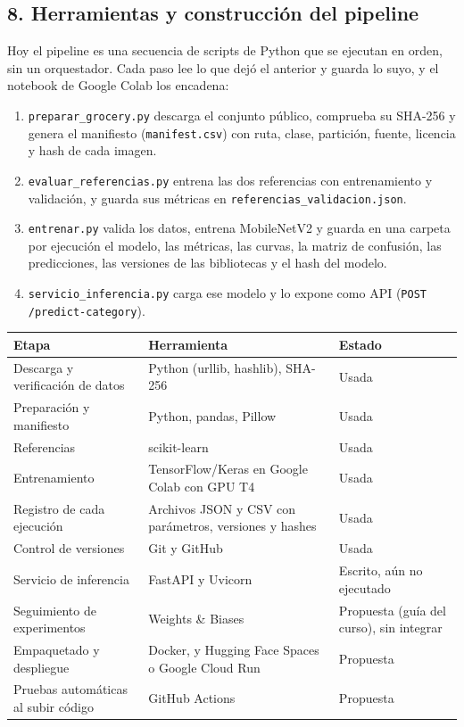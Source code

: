 \documentclass[11pt,a4paper]{article}
\begin{document}
\subsection*{8. Herramientas y construcción del pipeline}
\noindent Hoy el pipeline es una secuencia de scripts de Python que se ejecutan en orden, sin un orquestador. Cada paso lee lo que dejó el anterior y guarda lo suyo, y el notebook de Google Colab los encadena:\par
\begin{enumerate}[nosep]
\item \texttt{preparar\_grocery.py} descarga el conjunto público, comprueba su SHA-256 y genera el manifiesto (\texttt{manifest.csv}) con ruta, clase, partición, fuente, licencia y hash de cada imagen.
\item \texttt{evaluar\_referencias.py} entrena las dos referencias con entrenamiento y validación, y guarda sus métricas en \texttt{referencias\_validacion.json}.
\item \texttt{entrenar.py} valida los datos, entrena MobileNetV2 y guarda en una carpeta por ejecución el modelo, las métricas, las curvas, la matriz de confusión, las predicciones, las versiones de las bibliotecas y el hash del modelo.
\item \texttt{servicio\_inferencia.py} carga ese modelo y lo expone como API (\texttt{POST /predict-category}).
\end{enumerate}
\begin{center}\small
\begin{tabularx}{\textwidth}{XXX}
\toprule
\textbf{Etapa} & \textbf{Herramienta} & \textbf{Estado} \\
\midrule
Descarga y verificación de datos & Python (urllib, hashlib), SHA-256 & Usada \\
Preparación y manifiesto & Python, pandas, Pillow & Usada \\
Referencias & scikit-learn & Usada \\
Entrenamiento & TensorFlow/Keras en Google Colab con GPU T4 & Usada \\
Registro de cada ejecución & Archivos JSON y CSV con parámetros, versiones y hashes & Usada \\
Control de versiones & Git y GitHub & Usada \\
Servicio de inferencia & FastAPI y Uvicorn & Escrito, aún no ejecutado \\
Seguimiento de experimentos & Weights \& Biases & Propuesta (guía del curso), sin integrar \\
Empaquetado y despliegue & Docker, y Hugging Face Spaces o Google Cloud Run & Propuesta \\
Pruebas automáticas al subir código & GitHub Actions & Propuesta \\
\bottomrule
\end{tabularx}
\end{center}
\end{document}
